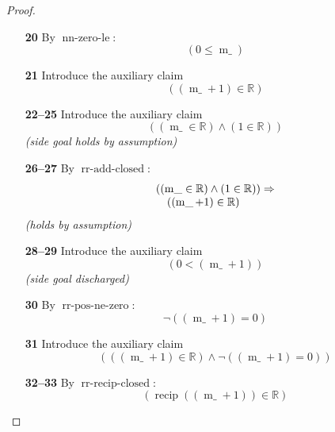 \documentclass[11pt]{article}
\theoremstyle{plain}
\begin{document}
\begin{proof}
\begin{itemize}[leftmargin=2.8em, itemsep=4pt, parsep=1pt]
  \item[\textbf{20}] By $\operatorname{nn\text{-}zero\text{-}le}$:
\begin{equation*}
(0 \leq \operatorname{m\_})
\end{equation*}

  \item[\textbf{21}] Introduce the auxiliary claim
\begin{equation*}
((\operatorname{m\_} + 1) \in \mathbb{R})
\end{equation*}

  \item[\textbf{22--25}] Introduce the auxiliary claim
\begin{equation*}
((\operatorname{m\_} \in \mathbb{R}) \wedge (1 \in \mathbb{R}))
\end{equation*}
  \emph{(side goal holds by assumption)}
  \item[\textbf{26--27}] By $\operatorname{rr\text{-}add\text{-}closed}$:
\begin{equation*}
\begin{array}{@{}l@{}} ((\operatorname{m\_} \in \mathbb{R}) \wedge (1 \in \mathbb{R})) \Rightarrow  \\ \quad ((\operatorname{m\_} + 1) \in \mathbb{R}) \end{array}
\end{equation*}
  \emph{(holds by assumption)}
  \item[\textbf{28--29}] Introduce the auxiliary claim
\begin{equation*}
(0 < (\operatorname{m\_} + 1))
\end{equation*}
  \emph{(side goal discharged)}
  \item[\textbf{30}] By $\operatorname{rr\text{-}pos\text{-}ne\text{-}zero}$:
\begin{equation*}
\neg ((\operatorname{m\_} + 1) = 0)
\end{equation*}

  \item[\textbf{31}] Introduce the auxiliary claim
\begin{equation*}
(((\operatorname{m\_} + 1) \in \mathbb{R}) \wedge \neg ((\operatorname{m\_} + 1) = 0))
\end{equation*}

  \item[\textbf{32--33}] By $\operatorname{rr\text{-}recip\text{-}closed}$:
\begin{equation*}
(\operatorname{recip}((\operatorname{m\_} + 1)) \in \mathbb{R})
\end{equation*}


\end{itemize}
\end{proof}
\end{document}
